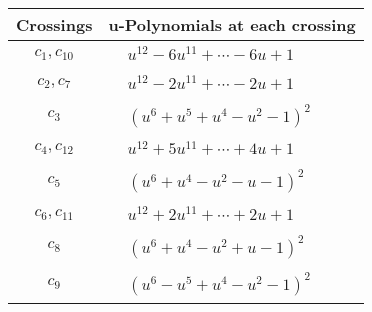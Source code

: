 \documentclass[1p]{elsarticle_modified}
\theoremstyle{definition}
\begin{document}
\begin{tabular}{m{50pt}|m{274pt}}
Crossings & \hspace{64pt}u-Polynomials at each crossing \\
\hline $$\begin{aligned}c_{1},c_{10}\end{aligned}$$&$\begin{aligned}
&u^{12}-6 u^{11}+\cdots-6 u+1
\end{aligned}$\\
\hline $$\begin{aligned}c_{2},c_{7}\end{aligned}$$&$\begin{aligned}
&u^{12}-2 u^{11}+\cdots-2 u+1
\end{aligned}$\\
\hline $$\begin{aligned}c_{3}\end{aligned}$$&$\begin{aligned}
&(u^6+u^5+u^4- u^2-1)^2
\end{aligned}$\\
\hline $$\begin{aligned}c_{4},c_{12}\end{aligned}$$&$\begin{aligned}
&u^{12}+5 u^{11}+\cdots+4 u+1
\end{aligned}$\\
\hline $$\begin{aligned}c_{5}\end{aligned}$$&$\begin{aligned}
&(u^6+u^4- u^2- u-1)^2
\end{aligned}$\\
\hline $$\begin{aligned}c_{6},c_{11}\end{aligned}$$&$\begin{aligned}
&u^{12}+2 u^{11}+\cdots+2 u+1
\end{aligned}$\\
\hline $$\begin{aligned}c_{8}\end{aligned}$$&$\begin{aligned}
&(u^6+u^4- u^2+u-1)^2
\end{aligned}$\\
\hline $$\begin{aligned}c_{9}\end{aligned}$$&$\begin{aligned}
&(u^6- u^5+u^4- u^2-1)^2
\end{aligned}$\\
\hline
\end{tabular}\\~\\
\end{document}

